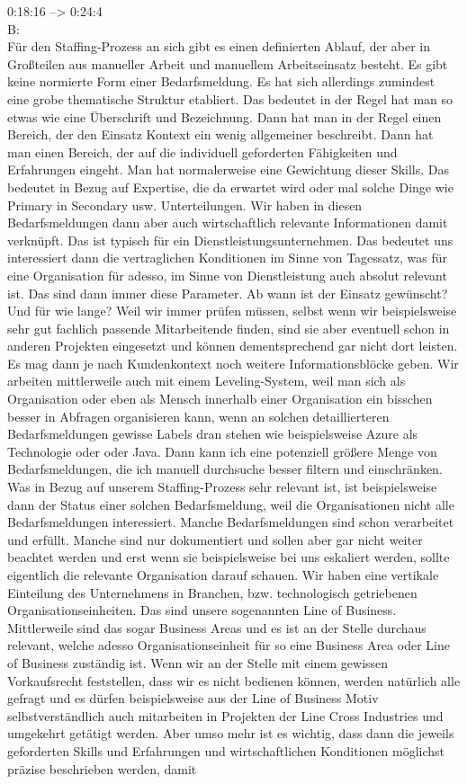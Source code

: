 0:18:16 --> 0:24:4\\
B:\\
Für den Staffing-Prozess an sich gibt es einen definierten Ablauf, der aber in Großteilen aus manueller Arbeit und manuellem Arbeitseinsatz besteht. Es gibt keine normierte Form einer Bedarfsmeldung. Es hat sich allerdings zumindest eine grobe thematische Struktur etabliert. Das bedeutet in der Regel hat man so etwas wie eine Überschrift und Bezeichnung. Dann hat man in der Regel einen Bereich, der den Einsatz Kontext ein wenig allgemeiner beschreibt. Dann hat man einen Bereich, der auf die individuell geforderten Fähigkeiten und Erfahrungen eingeht. Man hat normalerweise eine Gewichtung dieser Skills. Das bedeutet in Bezug auf Expertise, die da erwartet wird oder mal solche Dinge wie Primary in Secondary usw. Unterteilungen. Wir haben in diesen Bedarfsmeldungen dann aber auch wirtschaftlich relevante Informationen damit verknüpft. Das ist typisch für ein Dienstleistungsunternehmen. Das bedeutet uns interessiert dann die vertraglichen Konditionen im Sinne von Tagessatz, was für eine Organisation für adesso, im Sinne von Dienstleistung auch absolut relevant ist. Das sind dann immer diese Parameter. Ab wann ist der Einsatz gewünscht? Und für wie lange? Weil wir immer prüfen müssen, selbst wenn wir beispielsweise sehr gut fachlich passende Mitarbeitende finden, sind sie aber eventuell schon in anderen Projekten eingesetzt und können dementsprechend gar nicht dort leisten. Es mag dann je nach Kundenkontext noch weitere Informationsblöcke geben. Wir arbeiten mittlerweile auch mit einem Leveling-System, weil man sich als Organisation oder eben als Mensch innerhalb einer Organisation ein bisschen besser in Abfragen organisieren kann, wenn an solchen detaillierteren Bedarfsmeldungen gewisse Labels dran stehen wie beispielsweise Azure als Technologie oder oder Java. Dann kann ich eine potenziell größere Menge von Bedarfsmeldungen, die ich manuell durchsuche besser filtern und einschränken. Was in Bezug auf unserem Staffing-Prozess sehr relevant ist, ist beispielsweise dann der Status einer solchen Bedarfsmeldung, weil die Organisationen nicht alle Bedarfsmeldungen interessiert. Manche Bedarfsmeldungen sind schon verarbeitet und erfüllt. Manche sind nur dokumentiert und sollen aber gar nicht weiter beachtet werden und erst wenn sie beispielsweise bei uns eskaliert werden, sollte eigentlich die relevante Organisation darauf schauen. Wir haben eine vertikale Einteilung des Unternehmens in Branchen, bzw. technologisch getriebenen Organisationseinheiten. Das sind unsere sogenannten Line of Business. Mittlerweile sind das sogar Business Areas und es ist an der Stelle durchaus relevant, welche adesso Organisationseinheit für so eine Business Area oder Line of Business zuständig ist. Wenn wir an der Stelle mit einem gewissen Vorkaufsrecht feststellen, dass wir es nicht bedienen können, werden natürlich alle gefragt und es dürfen beispielsweise aus der Line of Business Motiv selbstverständlich auch mitarbeiten in Projekten der Line Cross Industries und umgekehrt getätigt werden. Aber umso mehr ist es wichtig, dass dann die jeweils geforderten Skills und Erfahrungen und wirtschaftlichen Konditionen möglichst präzise beschrieben werden, damit 